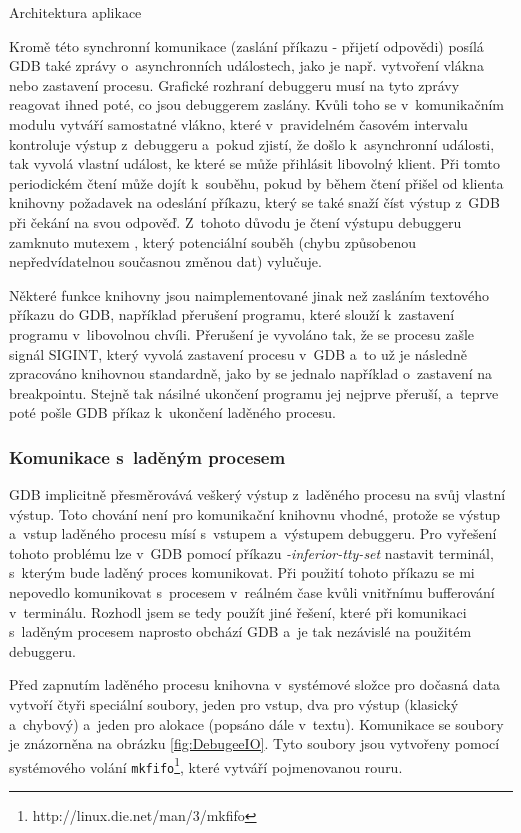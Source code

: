 \documentclass[czech,bachelor,male,python,dept460,hidelinks]{diploma}						%
\newcommand{\parspace}[1][]{
	\ifthenelse{\isempty{#1}}{\vspace{0mm}}{\vspace{#1}}
	\par
}
\begin{document}
\begin{section}{Architektura aplikace}
			\parspace Kromě této synchronní komunikace (zaslání příkazu - přijetí odpovědi) posílá GDB také zprávy o~asynchronních událostech, jako je např.
			vytvoření vlákna nebo zastavení procesu. Grafické rozhraní debuggeru musí na tyto zprávy reagovat ihned poté, co jsou debuggerem zaslány.
			Kvůli toho se v~komunikačním modulu vytváří samostatné vlákno, které v~pravidelném časovém intervalu kontroluje výstup z~debuggeru a~pokud zjistí, že došlo
			k~asynchronní události, tak vyvolá vlastní událost, ke které se může přihlásit libovolný klient. Při tomto periodickém čtení může dojít k~souběhu, pokud
			by během čtení přišel od klienta knihovny požadavek na odeslání příkazu, který se také snaží číst výstup z~GDB při čekání na svou odpověď.
			Z~tohoto důvodu je čtení výstupu debuggeru zamknuto mutexem \cite[81]{tanenbaum}, který potenciální souběh (chybu způsobenou nepředvídatelnou
			současnou změnou dat) vylučuje.
			
			\parspace Některé funkce knihovny jsou naimplementované jinak než zasláním textového příkazu do GDB, například přerušení programu, které
			slouží k~zastavení programu v~libovolnou chvíli. Přerušení je vyvoláno tak, že se procesu zašle signál SIGINT, který vyvolá zastavení procesu v~GDB a~to
			už je následně zpracováno knihovnou standardně, jako by se jednalo například o~zastavení na breakpointu. Stejně tak násilné ukončení programu jej
			nejprve přeruší, a~teprve poté pošle GDB příkaz k~ukončení laděného procesu.
			
		\subsubsection{Komunikace s~laděným procesem}
			GDB implicitně přesměrovává veškerý výstup z~laděného procesu na svůj vlastní výstup. Toto chování není pro komunikační knihovnu vhodné,
			protože se výstup a~vstup laděného procesu mísí s~vstupem a~výstupem debuggeru.
			Pro vyřešení tohoto problému lze v~GDB pomocí příkazu \mbox{\textit{-inferior-tty-set}} nastavit terminál, s~kterým bude laděný proces komunikovat.
			Při použití tohoto příkazu se mi nepovedlo komunikovat s~procesem v~reálném čase kvůli vnitřnímu bufferování v~terminálu.
			Rozhodl jsem se tedy použít jiné řešení, které při komunikaci s~laděným procesem naprosto obchází GDB a~je tak nezávislé na použitém debuggeru.
			
			\parspace Před zapnutím laděného procesu knihovna v~systémové složce pro dočasná data vytvoří čtyři speciální soubory, jeden pro vstup, dva pro výstup
			(klasický a~chybový) a~jeden pro alokace (popsáno dále v~textu). Komunikace se soubory je znázorněna na obrázku \ref{fig:DebugeeIO}.
			Tyto soubory jsou vytvořeny pomocí systémového volání \texttt{mkfifo}\footnote{http://linux.die.net/man/3/mkfifo}, které vytváří pojmenovanou rouru.
			

\end{section}
\end{document}

